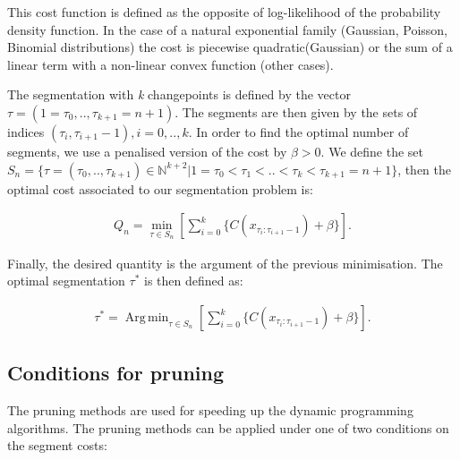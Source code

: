 \documentclass[a4paper,12pt]{article}
\DeclareMathOperator*{\argmin}{Arg\,min}
\begin{document}
	 	This cost function is defined as the opposite of log-likelihood of the probability density function. In the case of a natural exponential family (Gaussian, Poisson, Binomial distributions) the cost is piecewise quadratic(Gaussian) or the sum of a linear term with a non-linear convex function (other cases).
	 	
		The segmentation with \textit{k} changepoints is defined by the vector $\tau =(1 = \tau_0,..,\tau_{k+1} = n+1)$. The segments are then given by the sets of indices $(\tau_i, \tau_{i+1}-1), i = 0,..,k$. In order  to find the optimal number of segments, we use a penalised version of the cost by $\beta > 0$. We define the set $ S_n = \{ \tau = ( \tau_0,..,\tau_{k+1} ) \in \mathbb{N}^{k+2} | 1 =\tau_0 <\tau_1 < .. < \tau_k<\tau_{k+1} = n+1 \}  $, then the optimal cost associated to our segmentation problem is:
			
		\begin{equation}
			\begin{gathered}
				Q_n = \min_{\tau \in S_n}\left[ \sum_{i=0}^{k} \{C(x_{\tau_i:\tau_{i+1}-1})+\beta\} \right].
			\end{gathered}
			\label{eq:cost2}
		\end{equation}
		
		Finally, the desired quantity is the argument of the previous minimisation. The optimal segmentation $\tau^*$ is then defined as:
	 
		\begin{equation}
			\begin{gathered}
			\tau^* = \argmin_{\tau \in S_n}\left[ \sum_{i=0}^{k} \{C(x_{\tau_i:\tau_{i+1}-1})+\beta\} \right].
			\end{gathered}
			\label{eq:tau}
		\end{equation}
		
		\subsection{Conditions for pruning}
		\label{Conditions}
		
		 The pruning methods are used for speeding up the dynamic programming algorithms. The pruning methods can be applied under one of two conditions on the segment costs:
		 
\end{document}
